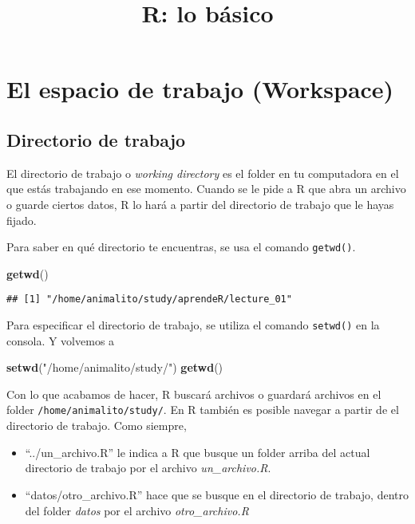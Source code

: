 \documentclass[]{article}
\title{R: lo básico}
\author{}
\date{}
\newenvironment{Shaded}{\begin{snugshade}}{\end{snugshade}}
\newcommand{\KeywordTok}[1]{\textcolor[rgb]{0.13,0.29,0.53}{\textbf{{#1}}}}
\newcommand{\StringTok}[1]{\textcolor[rgb]{0.31,0.60,0.02}{{#1}}}
\newcommand{\NormalTok}[1]{{#1}}
\begin{document}
\maketitle


\section{El espacio de trabajo
(Workspace)}\label{el-espacio-de-trabajo-workspace}

\subsection{Directorio de trabajo}\label{directorio-de-trabajo}

El directorio de trabajo o \emph{working directory} es el folder en tu
computadora en el que estás trabajando en ese momento. Cuando se le pide
a R que abra un archivo o guarde ciertos datos, R lo hará a partir del
directorio de trabajo que le hayas fijado.

Para saber en qué directorio te encuentras, se usa el comando
\texttt{getwd()}.

\begin{Shaded}
\begin{Highlighting}[]
\KeywordTok{getwd}\NormalTok{()}
\end{Highlighting}
\end{Shaded}

\begin{verbatim}
## [1] "/home/animalito/study/aprendeR/lecture_01"
\end{verbatim}

Para especificar el directorio de trabajo, se utiliza el comando
\texttt{setwd()} en la consola. Y volvemos a

\begin{Shaded}
\begin{Highlighting}[]
\KeywordTok{setwd}\NormalTok{(}\StringTok{"/home/animalito/study/"}\NormalTok{)}
\KeywordTok{getwd}\NormalTok{()}
\end{Highlighting}
\end{Shaded}

Con lo que acabamos de hacer, R buscará archivos o guardará archivos en
el folder \texttt{/home/animalito/study/}. En R también es posible
navegar a partir de el directorio de trabajo. Como siempre,

\begin{itemize}
\itemsep1pt\parskip0pt
\item
  ``../un\_archivo.R'' le indica a R que busque un folder arriba del
  actual directorio de trabajo por el archivo \emph{un\_archivo.R}.
\item
  ``datos/otro\_archivo.R'' hace que se busque en el directorio de
  trabajo, dentro del folder \emph{datos} por el archivo
  \emph{otro\_archivo.R}
\end{itemize}
\end{document}
